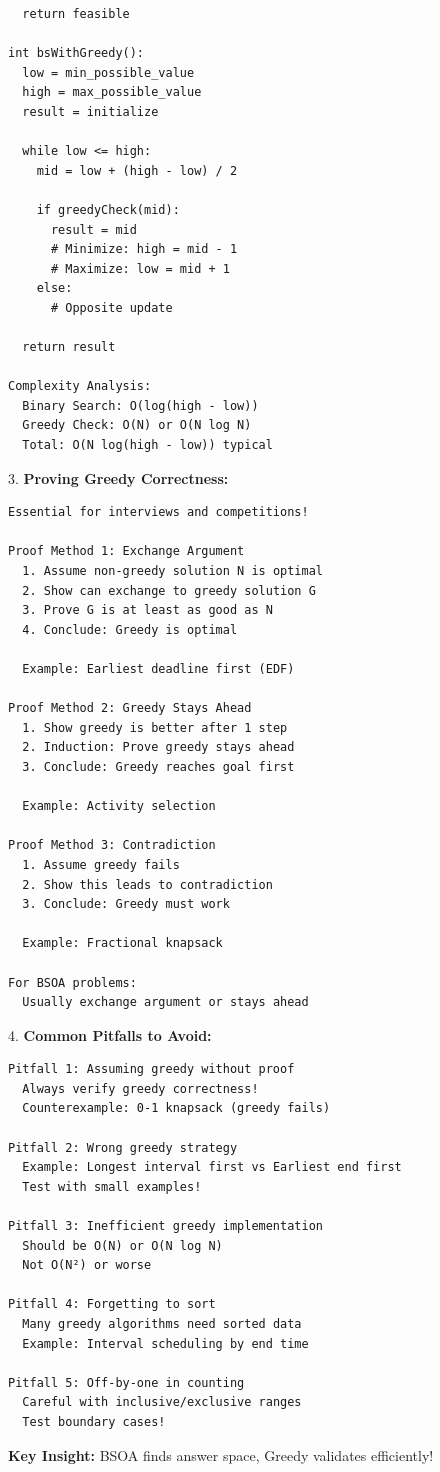 \documentclass[11pt,a4paper,oneside]{book}
\begin{document}
\begin{tcolorbox}[
    enhanced,breakable,
    colback=white,
    colframe=deepblue,
    boxrule=1.5pt,
    arc=3mm,
    title=\textbf{The Synergy of BS and Greedy}
]
\begin{verbatim}
  return feasible

int bsWithGreedy():
  low = min_possible_value
  high = max_possible_value
  result = initialize
  
  while low <= high:
    mid = low + (high - low) / 2
    
    if greedyCheck(mid):
      result = mid
      # Minimize: high = mid - 1
      # Maximize: low = mid + 1
    else:
      # Opposite update
  
  return result

Complexity Analysis:
  Binary Search: O(log(high - low))
  Greedy Check: O(N) or O(N log N)
  Total: O(N log(high - low)) typical
\end{verbatim}

3. \textbf{Proving Greedy Correctness:}
\begin{verbatim}
Essential for interviews and competitions!

Proof Method 1: Exchange Argument
  1. Assume non-greedy solution N is optimal
  2. Show can exchange to greedy solution G
  3. Prove G is at least as good as N
  4. Conclude: Greedy is optimal
  
  Example: Earliest deadline first (EDF)

Proof Method 2: Greedy Stays Ahead
  1. Show greedy is better after 1 step
  2. Induction: Prove greedy stays ahead
  3. Conclude: Greedy reaches goal first
  
  Example: Activity selection

Proof Method 3: Contradiction
  1. Assume greedy fails
  2. Show this leads to contradiction
  3. Conclude: Greedy must work
  
  Example: Fractional knapsack

For BSOA problems:
  Usually exchange argument or stays ahead
\end{verbatim}

4. \textbf{Common Pitfalls to Avoid:}
\begin{verbatim}
Pitfall 1: Assuming greedy without proof
  Always verify greedy correctness!
  Counterexample: 0-1 knapsack (greedy fails)

Pitfall 2: Wrong greedy strategy
  Example: Longest interval first vs Earliest end first
  Test with small examples!

Pitfall 3: Inefficient greedy implementation
  Should be O(N) or O(N log N)
  Not O(N²) or worse

Pitfall 4: Forgetting to sort
  Many greedy algorithms need sorted data
  Example: Interval scheduling by end time

Pitfall 5: Off-by-one in counting
  Careful with inclusive/exclusive ranges
  Test boundary cases!
\end{verbatim}

\textbf{Key Insight:}
BSOA finds answer space, Greedy validates efficiently!
\end{tcolorbox}
\end{document}
